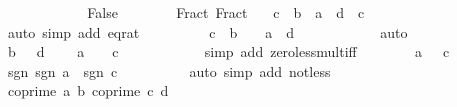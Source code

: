 \begin{isabellebody}
\ \ \ \ \isamarkupfalse%
\isanewline
\ \ \ \ \ \ \isamarkupfalse%
\ False\isanewline
\ \ \ \ \ \ \isamarkupfalse%
\ Fract\ Fract{\isacharprime}{\kern0pt}\ \isamarkupfalse%
\ {\isacharasterisk}{\kern0pt}{\isacharcolon}{\kern0pt}\ {\isachardoublequoteopen}c\ {\isacharasterisk}{\kern0pt}\ b\ {\isacharequal}{\kern0pt}\ a\ {\isacharasterisk}{\kern0pt}\ d{\isachardoublequoteclose}\ \ {\isachardoublequoteopen}c\ {\isasymnoteq}\ {}{\isachardoublequoteclose}\isanewline
\ \ \ \ \ \ \ \ \isamarkupfalse%
\ {\isacharparenleft}{\kern0pt}auto\ simp\ add{\isacharcolon}{\kern0pt}\ eq{\isacharunderscore}{\kern0pt}rat{\isacharparenright}{\kern0pt}\isanewline
\ \ \ \ \ \ \isamarkupfalse%
\ \isamarkupfalse%
\ {\isachardoublequoteopen}c\ {\isacharasterisk}{\kern0pt}\ b\ {\isachargreater}{\kern0pt}\ {}\ {\isasymlongleftrightarrow}\ a\ {\isacharasterisk}{\kern0pt}\ d\ {\isachargreater}{\kern0pt}\ {}{\isachardoublequoteclose}\isanewline
\ \ \ \ \ \ \ \ \isamarkupfalse%
\ auto\isanewline
\ \ \ \ \ \ \isamarkupfalse%
\ {\isacartoucheopen}b\ {\isachargreater}{\kern0pt}\ {}{\isacartoucheclose}\ {\isacartoucheopen}d\ {\isachargreater}{\kern0pt}\ {}{\isacartoucheclose}\ \isamarkupfalse%
\ {\isachardoublequoteopen}a\ {\isachargreater}{\kern0pt}\ {}\ {\isasymlongleftrightarrow}\ c\ {\isachargreater}{\kern0pt}\ {}{\isachardoublequoteclose}\isanewline
\ \ \ \ \ \ \ \ \isamarkupfalse%
\ {\isacharparenleft}{\kern0pt}simp\ add{\isacharcolon}{\kern0pt}\ zero{\isacharunderscore}{\kern0pt}less{\isacharunderscore}{\kern0pt}mult{\isacharunderscore}{\kern0pt}iff{\isacharparenright}{\kern0pt}\isanewline
\ \ \ \ \ \ \isamarkupfalse%
\ {\isacartoucheopen}a\ {\isasymnoteq}\ {}{\isacartoucheclose}\ {\isacartoucheopen}c\ {\isasymnoteq}\ {}{\isacartoucheclose}\ \isamarkupfalse%
\ sgn{\isacharcolon}{\kern0pt}\ {\isachardoublequoteopen}sgn\ a\ {\isacharequal}{\kern0pt}\ sgn\ c{\isachardoublequoteclose}\isanewline
\ \ \ \ \ \ \ \ \isamarkupfalse%
\ {\isacharparenleft}{\kern0pt}auto\ simp\ add{\isacharcolon}{\kern0pt}\ not{\isacharunderscore}{\kern0pt}less{\isacharparenright}{\kern0pt}\isanewline
\ \ \ \ \ \ \isamarkupfalse%
\ {\isacartoucheopen}coprime\ a\ b{\isacartoucheclose}\ {\isacartoucheopen}coprime\ c\ d{\isacartoucheclose}\ \isamarkupfalse%

\end{isabellebody}
